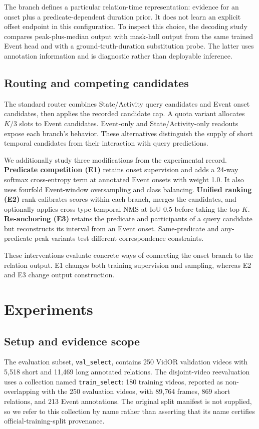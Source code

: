 \documentclass[10pt,twocolumn,letterpaper]{article}
\begin{document}
The branch defines a particular relation-time representation: evidence for an onset plus a predicate-dependent duration prior. It does not learn an explicit offset endpoint in this configuration. To inspect this choice, the decoding study compares peak-plus-median output with mask-hull output from the same trained Event head and with a ground-truth-duration substitution probe. The latter uses annotation information and is diagnostic rather than deployable inference.

\subsection{Routing and competing candidates}
The standard router combines State/Activity query candidates and Event onset candidates, then applies the recorded candidate cap. A quota variant allocates $K/3$ slots to Event candidates. Event-only and State/Activity-only readouts expose each branch's behavior. These alternatives distinguish the supply of short temporal candidates from their interaction with query predictions.

We additionally study three modifications from the experimental record. \textbf{Predicate competition (E1)} retains onset supervision and adds a 24-way softmax cross-entropy term at annotated Event onsets with weight 1.0. It also uses fourfold Event-window oversampling and class balancing. \textbf{Unified ranking (E2)} rank-calibrates scores within each branch, merges the candidates, and optionally applies cross-type temporal NMS at IoU 0.5 before taking the top $K$. \textbf{Re-anchoring (E3)} retains the predicate and participants of a query candidate but reconstructs its interval from an Event onset. Same-predicate and any-predicate peak variants test different correspondence constraints.

These interventions evaluate concrete ways of connecting the onset branch to the relation output. E1 changes both training supervision and sampling, whereas E2 and E3 change output construction.

\section{Experiments}
\subsection{Setup and evidence scope}
The evaluation subset, \texttt{val\_select}, contains 250 VidOR validation videos with 5,518 short and 11,469 long annotated relations. The disjoint-video reevaluation uses a collection named \texttt{train\_select}: 180 training videos, reported as non-overlapping with the 250 evaluation videos, with 89,764 frames, 869 short relations, and 213 Event annotations. The original split manifest is not supplied, so we refer to this collection by name rather than asserting that its name certifies official-training-split provenance.
\end{document}

